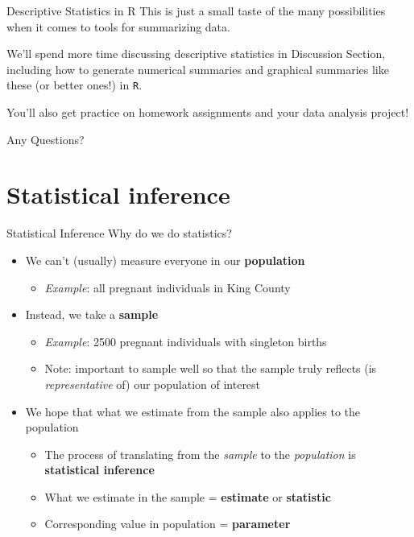 \documentclass[10pt,t]{beamer}
\begin{document}
\begin{frame}{Descriptive Statistics in R}
This is just a small taste of the many possibilities when it comes to tools for summarizing data.

\vspace{0.3cm}

We’ll spend more time discussing descriptive statistics in Discussion Section, including how to generate numerical summaries and graphical summaries like these (or better ones!) in \texttt{R}.

\vspace{0.3cm}

You’ll also get practice on homework assignments and your data analysis project!

\end{frame}

\begin{frame}[c]
\centering \huge Any Questions?
\end{frame}

\section{Statistical inference}

\begin{frame}{Statistical Inference} 
Why do we do statistics?

\begin{itemize}
	\item We can't (usually) measure everyone in our \textbf{population}
	\begin{itemize}
		\item \textit{Example}: all pregnant individuals in King County
	\end{itemize}
	\item Instead, we take a \textbf{sample}
	\begin{itemize}
		\item \textit{Example}: 2500 pregnant individuals with singleton births
		\item Note: important to sample well so that the sample truly reflects (is \textit{representative} of) our population of interest
	\end{itemize}
	\item We hope that what we estimate from the sample also applies to the population
	\begin{itemize}
		\item The process of translating from the \textit{sample} to the \textit{population} is \textbf{statistical inference}
		\item What we estimate in the sample = \textbf{estimate} or \textbf{statistic}
		\item Corresponding value in population = \textbf{parameter}
	\end{itemize}
\end{itemize}
\end{frame}
\end{document}
